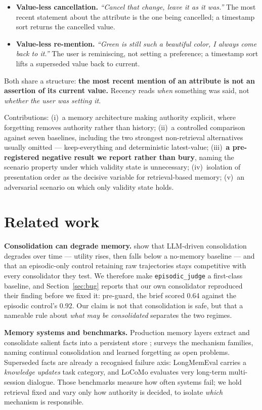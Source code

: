 \documentclass{article}
\begin{document}
\begin{itemize}
\itemsep0em
\item \textbf{Value-less cancellation.} \emph{``Cancel that change, leave it as it was.''} The most recent statement about the attribute is the one being cancelled; a timestamp sort returns the cancelled value.
\item \textbf{Value-less re-mention.} \emph{``Green is still such a beautiful color, I always come back to it.''} The user is reminiscing, not setting a preference; a timestamp sort lifts a superseded value back to current.
\end{itemize}

Both share a structure: \textbf{the most recent mention of an attribute is not an assertion of its current value.} Recency reads \emph{when} something was said, not \emph{whether the user was setting it}.

Contributions: (i)~a memory architecture making authority explicit, where forgetting removes authority rather than history; (ii)~a controlled comparison against seven baselines, including the two strongest non-retrieval alternatives usually omitted --- keep-everything and deterministic latest-value; (iii)~\textbf{a pre-registered negative result we report rather than bury}, naming the scenario property under which validity state is unnecessary; (iv)~isolation of presentation order as the decisive variable for retrieval-based memory; (v)~an adversarial scenario on which only validity state holds.

\section{Related work}

\textbf{Consolidation can degrade memory.} \citet{zhang2026faulty} show that LLM-driven consolidation degrades over time --- utility rises, then falls below a no-memory baseline --- and that an episodic-only control retaining raw trajectories stays competitive with every consolidator they test. We therefore make \texttt{episodic\_judge} a first-class baseline, and Section~\ref{sec:bug} reports that our own consolidator reproduced their finding before we fixed it: pre-guard, the brief scored 0.64 against the episodic control's 0.92. Our claim is not that consolidation is safe, but that a nameable rule about \emph{what may be consolidated} separates the two regimes.

\textbf{Memory systems and benchmarks.} Production memory layers extract and consolidate salient facts into a persistent store \citep{chhikara2025mem0}; \citet{du2026survey} surveys the mechanism families, naming continual consolidation and learned forgetting as open problems. Superseded facts are already a recognised failure axis: LongMemEval \citep{wu2024longmemeval} carries a \emph{knowledge updates} task category, and LoCoMo \citep{maharana2024locomo} evaluates very long-term multi-session dialogue. Those benchmarks measure how often systems fail; we hold retrieval fixed and vary only how authority is decided, to isolate \emph{which} mechanism is responsible.
\end{document}
